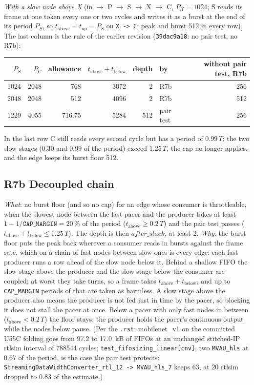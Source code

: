\documentclass[10pt,a4paper]{article}
\newcommand{\code}[1]{\texttt{#1}}
\newcommand{\Tg}{T}           %
\begin{document}
\emph{With a slow node above X} (in $\to$ P $\to$ S $\to$ X $\to$ C, $P_X=1024$; S reads
its frame at one token every one or two cycles and writes it as a burst at the end of
its period $P_S$, so $t_{\mathrm{above}}=t_{\mathrm{up}}=P_S$ on \code{X -> C}; peak and
burst 512 in every row). The last column is the rule of the earlier revision
(\code{39dac9a18}: no pair test, no R7b):
\begin{center}\small
\begin{tabular}{@{}rrrrrlr@{}}
\toprule
$P_S$ & $P_C$ & allowance & $t_{\mathrm{above}}+t_{\mathrm{below}}$ & depth & by & without pair test, R7b\\
\midrule
1024 & 2048 & 768    & 3072 & 2   & R7b & 256\\
2048 & 2048 & 512    & 4096 & 2   & R7b & 512\\
1229 & 4055 & 716.75 & 5284 & 512 & pair test & 256\\
\bottomrule
\end{tabular}
\end{center}
In the last row C still reads every second cycle but has a period of $0.99\,\Tg$: the
two slow stages (0.30 and 0.99 of the period) exceed $1.25\,\Tg$, the cap no longer
applies, and the edge keeps its burst floor 512.

\subsection{R7b Decoupled chain}\label{sec:decoupled}

\emph{What}: no burst floor (and so no cap) for an edge whose consumer is throttleable,
when the slowest node between the last pacer and the producer takes at least
$1-1/\code{CAP\_MARGIN}=20\,\%$ of the period ($t_{\mathrm{above}}\ge0.2\,\Tg$) and the
pair test passes ($t_{\mathrm{above}}+t_{\mathrm{below}}\le1.25\,\Tg$). The depth is then
$\mathit{after\_slack}$, at least 2. \emph{Why}: the burst floor puts the peak back
wherever a consumer reads in bursts against the frame rate, which on a chain of fast
nodes between slow ones is every edge: each fast producer runs a row ahead of the slow
node below it. Behind a shallow FIFO the slow stage above the producer and the slow
stage below the consumer are coupled; at worst they take turns, so a frame takes
$t_{\mathrm{above}}+t_{\mathrm{below}}$, and up to \code{CAP\_MARGIN} periods of that are
taken as harmless. A slow stage above the producer also means the producer is not fed
just in time by the pacer, so blocking it does not stall the pacer at once. Below a
pacer with only fast nodes in between ($t_{\mathrm{above}}<0.2\,\Tg$) the floor stays:
the producer holds the pacer's continuous output while the nodes below pause. (Per the
\code{.rst}: mobilenet\_v1 on the committed U55C folding goes from 97.2 to 17.0~kB of
FIFOs at an unchanged stitched-IP rtlsim interval of 788544 cycles;
\code{test\_fifosizing\_linear[cnv]}, two \code{MVAU\_hls} at 0.67 of the period, is
the case the pair test protects: \code{StreamingDataWidthConverter\_rtl\_12 ->
MVAU\_hls\_7} keeps 63, at 20 rtlsim dropped to 0.83 of the estimate.)
\end{document}
